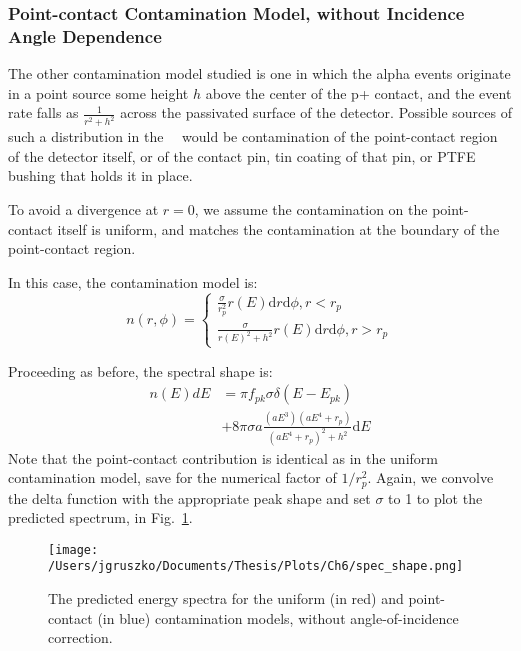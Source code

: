 \subsubsection{Point-contact Contamination Model, without Incidence Angle Dependence}\label{sssec:point_model_noAngle}
The other contamination model studied is one in which the alpha events originate in a point source some height $h$ above the center of the p+ contact, and the event rate falls as $\frac{1}{r^2+h^2}$ across the passivated surface of the detector. Possible sources of such a distribution in the \MJ\ \DEM\ would be contamination of the point-contact region of the detector itself, or of the contact pin, tin coating of that pin, or PTFE bushing that holds it in place. 

To avoid a divergence at $r=0$, we assume the contamination on the point-contact itself is uniform, and matches the contamination at the boundary of the point-contact region. 

In this case, the contamination model is:
$$n(r, \phi)=
\begin{cases}
\frac{\sigma}{r_p^2} r(E) \mathrm{d}r \mathrm{d}\phi, r<r_p \\
\frac{\sigma}{r(E)^2+h^2} r(E) \mathrm{d}r \mathrm{d}\phi, r>r_p
\end{cases}
$$

Proceeding as before, the spectral shape is:
\begin{equation}
\begin{split}
n(E)dE &= \pi f_{pk}\sigma\delta(E-E_{pk}) \\
&+ 8\pi \sigma a \frac{(aE^3)(aE^4+r_p)}{(aE^4+r_p)^2+h^2} \mathrm{d}E
\end{split}
\end{equation}
Note that the point-contact contribution is identical as in the uniform contamination model, save for the numerical factor of $1/r_p^2$. Again, we convolve the delta function with the appropriate peak shape and set $\sigma$ to 1 to plot the predicted spectrum, in Fig.~\ref{fig:spec_shape}. 

\begin{figure}[]
 \centering
 \texttt{[image: /Users/jgruszko/Documents/Thesis/Plots/Ch6/spec\_shape.png]}
 \caption[The predicted energy spectra for the uniform and point-contact contamination models]{The predicted energy spectra for the uniform (in red) and point-contact (in blue) contamination models, without angle-of-incidence correction.} 
 \label{fig:spec_shape}
\end{figure}


